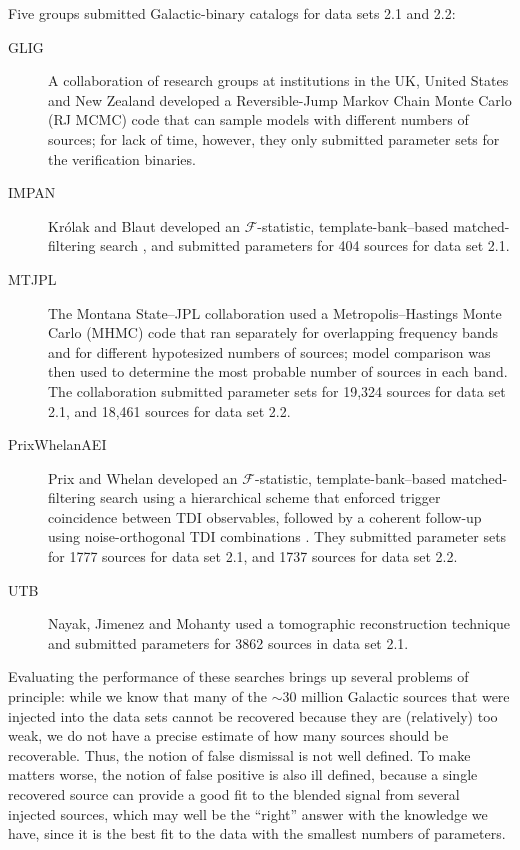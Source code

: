 \documentclass{iopart}
\begin{document}
Five groups submitted Galactic-binary catalogs for data sets 2.1 and 2.2:
%
\begin{description}
\item[GLIG] A collaboration of research groups at institutions in the UK, United States and New Zealand developed a Reversible-Jump Markov Chain Monte Carlo (RJ MCMC) code that can sample models with different numbers of sources; for lack of time, however, they only submitted parameter sets for the verification binaries.
\item[IMPAN] Kr\'olak and Blaut developed an $\mathcal{F}$-statistic, template-bank--based matched-filtering search \cite{JKS98,KTV04}, and submitted parameters for 404 sources for data set 2.1.
\item[MTJPL] The Montana State--JPL collaboration used a Metropolis--Hastings Monte Carlo (MHMC) code that ran separately for overlapping frequency bands and for different hypotesized numbers of sources; model comparison was then used to determine the most probable number of sources in each band. The collaboration submitted parameter sets for 19,324 sources for data set 2.1, and 18,461 sources for data set 2.2.
\item[PrixWhelanAEI] Prix and Whelan developed an $\mathcal{F}$-statistic,
template-bank--based matched-filtering search using a hierarchical
scheme that enforced trigger coincidence between TDI observables,
followed by a coherent follow-up using noise-orthogonal TDI
combinations \cite{prixwhelan}. They submitted parameter sets for 1777 sources for data set 2.1, and 1737 sources for data set 2.2.
\item[UTB] Nayak, Jimenez and Mohanty used a tomographic reconstruction technique and submitted parameters for 3862 sources in data set 2.1.
\end{description}
%
Evaluating the performance of these searches brings up several problems of principle: while we know that many of the $\sim 30$ million Galactic sources that were injected into the data sets cannot be recovered because they are (relatively) too weak, we do not have a precise estimate of how many sources should be recoverable. Thus, the notion of false dismissal is not well defined. To make matters worse, the notion of false positive is also ill defined, because a single recovered source can provide a good fit to the blended signal from several injected sources, which may well be the ``right'' answer with the knowledge we have, since it is the best fit to the data with the smallest numbers of parameters.
\end{document}
